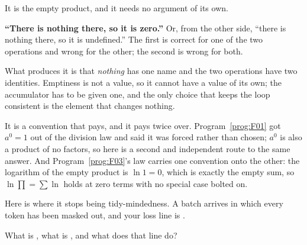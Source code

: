 \begin{fr}
It is the empty product, and it needs no argument of its own.

\begin{trapbox}
\textbf{\enquote{There is nothing there, so it is zero.}} Or, from the other
side, \enquote{there is nothing there, so it is undefined.} The first is
correct for one of the two operations and wrong for the other; the second is
wrong for both.

What produces it is that \emph{nothing} has one name and the two operations
have two identities. Emptiness is not a value, so it cannot have a value of
its own; the accumulator has to be given one, and the only choice that keeps
the loop consistent is the element that changes nothing.

It is a convention that pays, and it pays twice over. Program~\ref{prog:F01}
got $a^{0} = 1$ out of the division law and said it was forced rather than
chosen; $a^{0}$ is also a product of no factors, so here is a second and
independent route to the same answer. And Program~\ref{prog:F03}'s law carries
one convention onto the other: the logarithm of the empty product is
$\ln 1 = 0$, which is exactly the empty sum, so $\ln \prod = \sum \ln$ holds
at zero terms with no special case bolted on.
\end{trapbox}

Here is where it stops being tidy-mindedness. A batch arrives in which every
token has been masked out, and your loss line is .

What is , what is , and what does that line do?
\nextframe
\end{fr}

